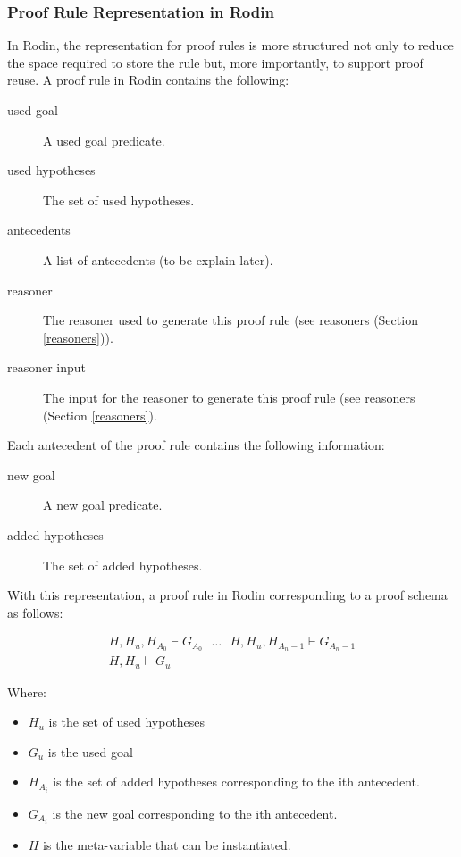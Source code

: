 
\subsubsection{Proof Rule Representation in Rodin}

In Rodin, the representation for proof rules is more structured not only to reduce the space required to store the rule but, more importantly, to support proof reuse.
A proof rule in Rodin contains the following:

\begin{description}
	\item[used goal] A used goal predicate. 
	\item[used hypotheses] The set of used hypotheses. 
	\item[antecedents] A list of antecedents (to be explain later). 
	\item[reasoner] The reasoner used to generate this proof rule (see reasoners (Section \ref{reasoners})). 
	\item[reasoner input] The input for the reasoner to generate this proof rule (see reasoners (Section \ref{reasoners}). 
\end{description}

Each antecedent of the proof rule contains the following information:

\begin{description}
	\item[new goal] A new goal predicate. 
	\item[added hypotheses] The set of added hypotheses. 
\end{description}

With this representation, a proof rule in Rodin corresponding to a proof schema as follows: 

$$\begin{array}{c} H, H_u, H_{A_0} \vdash G_{A_0} ~~~\ldots~~~ H, H_u, H_{A_n-1} \vdash G_{A_n-1} \\ \hline H, H_u \vdash G_u \end{array} $$

Where:
\begin{itemize}
	\item     $H_u$ is the set of used hypotheses 
	\item     $G_u$ is the used goal 
	\item     $H_{A_i}$ is the set of added hypotheses corresponding to the ith antecedent. 
	\item     $G_{A_i}$ is the new goal corresponding to the ith antecedent. 
	\item     $H$ is the meta-variable that can be instantiated. 
\end{itemize}

